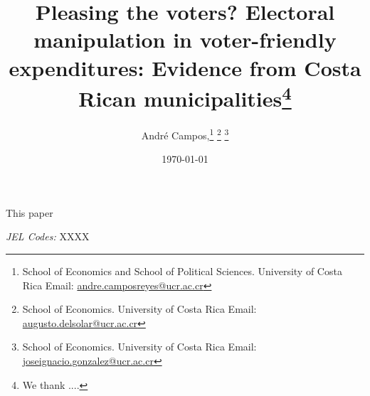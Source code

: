 \documentclass[12pt,letterpaper]{article}
\title{\LARGE{Pleasing the voters? Electoral manipulation in voter-friendly expenditures: Evidence from Costa Rican municipalities}\thanks{\footnotesize We thank ....}}
\author{\large \vspace{0.5cm} André Campos,\thanks{School of Economics and School of Political Sciences. University of Costa Rica Email: \href{mailto:andre.camposreyes@ucr.ac.cr}{andre.camposreyes@ucr.ac.cr}}
	\text{ Augusto del Solar}\thanks{School of Economics. University of Costa Rica Email: \href{mailto:augusto.delsolar@ucr.ac.cr}{augusto.delsolar@ucr.ac.cr}}
	\text{ and José I. González-Rojas}\thanks{School of Economics. University of Costa Rica Email: \href{mailto:joseignacio.gonzalez@ucr.ac.cr}{joseignacio.gonzalez@ucr.ac.cr}}
}
\date{\today}
\begin{document}
	\onehalfspacing
	\setlength{\parindent}{1cm}
	\clearpage\maketitle
	\thispagestyle{empty}
	\setcounter{page}{0}
	\maketitle
	
	\begin{small}
		\onehalfspacing
		\vspace{0.75cm}
		This paper 
		\vspace{20pt}
		
		\textit{JEL Codes:} XXXX
	\end{small}
	
	\newpage
	\setcounter{page}{1}
	










\printbibliography
	
\end{document}
